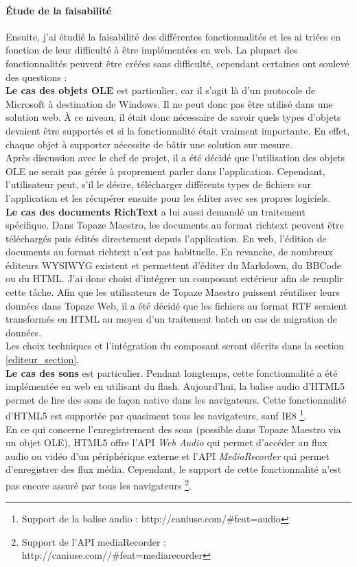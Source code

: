 \paragraph{Étude de la faisabilité\\}
Ensuite, j'ai étudié la faisabilité des différentes fonctionnalités et les ai triées en fonction de leur difficulté à être implémentées en web. La plupart des fonctionnalités peuvent être créées sans difficulté, cependant certaines ont soulevé des questions :\\

\textbf{Le cas des objets OLE} est particulier, car il s'agit là d'un protocole de Microsoft à destination de Windows. 
Il ne peut donc pas être utilisé dans une solution web. À ce niveau, il était donc nécessaire de savoir quels types d'objets devaient être supportés et si la fonctionnalité était vraiment importante. En effet, chaque objet à supporter nécessite de bâtir une solution sur mesure.\\
Après discussion avec le chef de projet, il a été décidé que l'utilisation des objets OLE ne serait pas gérée à proprement parler dans l'application. Cependant, l'utilisateur peut, s'il le désire, télécharger différents types de fichiers sur l'application et les récupérer ensuite pour les éditer avec ses propres logiciels.\\

\textbf{Le cas des documents RichText} a lui aussi demandé un traitement spécifique. Dans Topaze Maestro, les documents au format richtext peuvent être téléchargés puis édités directement depuis l'application. En web, l'édition de documents au format richtext n'est pas habituelle. En revanche, de nombreux éditeurs \gls{WYSIWYG} existent et permettent d'éditer du Markdown, du BBCode ou du HTML. J'ai donc choisi d'intégrer un composant extérieur afin de remplir cette tâche. Afin que les utilisateurs de Topaze Maestro puissent réutiliser leurs données dans Topaze Web, il a été décidé que les fichiers au format RTF seraient transformés en HTML au moyen d'un traitement batch en cas de migration de données. \\
Les choix techniques et l'intégration du composant seront décrits dans la section \ref{editeur_section}.\\

\textbf{Le cas des sons} est particulier. Pendant longtemps, cette fonctionnalité a été implémentée en web en utilisant du flash. Aujourd'hui, la balise audio d'HTML5 permet de lire des sons de façon native dans les navigateurs. Cette fonctionnalité d'HTML5 est supportée par quasiment tous les navigateurs, sauf IE8 \footnote{Support de la balise audio : http://caniuse.com/\#feat=audio}. \\
En ce qui concerne l'enregistrement des sons (possible dans Topaze Maestro via un objet OLE), HTML5 offre l'API \textit{Web Audio}\cite{bib:webaudio} qui permet d'accéder au flux audio ou vidéo d'un périphérique externe et l'API \textit{MediaRecorder}\cite{bib:mediarecorder} qui permet d'enregistrer des flux média. Cependant, le support de cette fonctionnalité n'est pas encore assuré par tous les navigateurs \footnote{Support de l'API mediaRecorder : http://caniuse.com//\#feat=mediarecorder}. 


